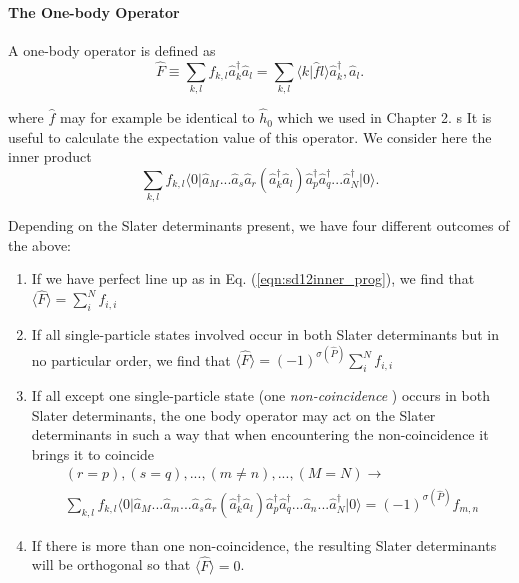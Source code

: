 \paragraph{The One-body Operator}

A one-body operator is defined as \cite{ShavittBartlett2009}
\begin{equation}
\hat{F} \equiv \sum_{k,l} f_{k,l}  \hat{a}_k^{\dagger} \hat{a}_l = \sum_{k,l} \langle k \vert \hat{f} l \rangle   \hat{a}_k^{\dagger}, \hat{a}_l.
\label{eqn:onebody}
\end{equation}

where $\hat{f}$ may for example be identical to $\hat{h}_0$ which we used in Chapter 2.
s
It is useful to calculate the expectation value of this operator. We consider here the inner product
\begin{equation}
 \sum_{k,l} f_{k,l}  \langle 0\vert  \hat{a}_M ...  \hat{a}_s  \hat{a}_r ( \hat{a}_k^{\dagger} \hat{a}_l)  \hat{a}_p^\dagger \hat{a}_q^\dagger  ... \hat{a}_N^\dagger \vert 0 \rangle.
\label{eqn:sd12inner_op}
\end{equation}

Depending on the Slater determinants present, we  have four different outcomes of the above:
\begin{enumerate}
\item If we have perfect line up as in Eq. (\ref{eqn:sd12inner_prog}), we find that $\langle \hat{F} \rangle = \sum_i^N f_{i,i}$
\item If all single-particle states involved occur in both Slater determinants but in no particular order, we find that $\langle \hat{F} \rangle =(-1)^{\sigma(\hat{P})} \sum_i^N f_{i,i}$
\item If all except one single-particle state (one \emph{non-coincidence} \cite{ShavittBartlett2009}) occurs in both Slater determinants, the one body operator may act on the Slater determinants in such a way that when encountering the non-coincidence it brings it to coincide
\begin{multline}
(r=p), (s=q), ...,(m \neq n) , ... ,(M=N) \rightarrow \\ \sum_{k,l} f_{k,l}  \langle 0\vert  \hat{a}_M ...  \hat{a}_m ... \hat{a}_s  \hat{a}_r ( \hat{a}_k^{\dagger} \hat{a}_l)  \hat{a}_p^\dagger \hat{a}_q^\dagger  ... \hat{a}_n...\hat{a}_N^\dagger \vert 0 \rangle =(-1)^{\sigma(\hat{P})} f_{m,n}
\end{multline}
\label{eqn:sd12inner_noncoincide}
\item If there is more than one non-coincidence, the resulting Slater determinants will be orthogonal so that $\langle \hat{F} \rangle = 0$.
\end{enumerate}



